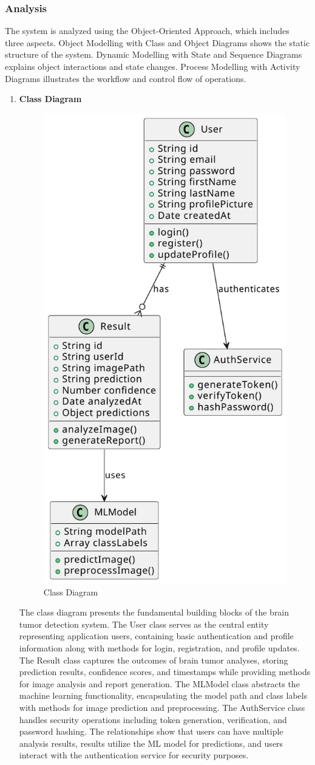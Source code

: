 \subsubsection{Analysis}
The system is analyzed using the Object-Oriented Approach, which includes three
aspects. Object Modelling with Class and Object Diagrams shows the static
structure of the system. Dynamic Modelling with State and Sequence Diagrams
explains object interactions and state changes. Process Modelling with Activity
Diagrams illustrates the workflow and control flow of operations.
\begin{enumerate}[label=\roman*.]
    \item \textbf{Class Diagram}
          \begin{center}
              \begin{figure}[H]
                  \centering
                  \includegraphics[width=0.50\linewidth]{Images/Highlevel/class.pdf}
                  \caption{Class Diagram}
                  \label{fig:ClassDiagram}
              \end{figure}
          \end{center}
          The class diagram presents the fundamental building blocks of the brain tumor detection system. The User class serves as the central entity representing application users, containing basic authentication and profile information along with methods for login, registration, and profile updates. The Result class captures the outcomes of brain tumor analyses, storing prediction results, confidence scores, and timestamps while providing methods for image analysis and report generation. The MLModel class abstracts the machine learning functionality, encapsulating the model path and class labels with methods for image prediction and preprocessing. The AuthService class handles security operations including token generation, verification, and password hashing. The relationships show that users can have multiple analysis results, results utilize the ML model for predictions, and users interact with the authentication service for security purposes.

\end{enumerate}
